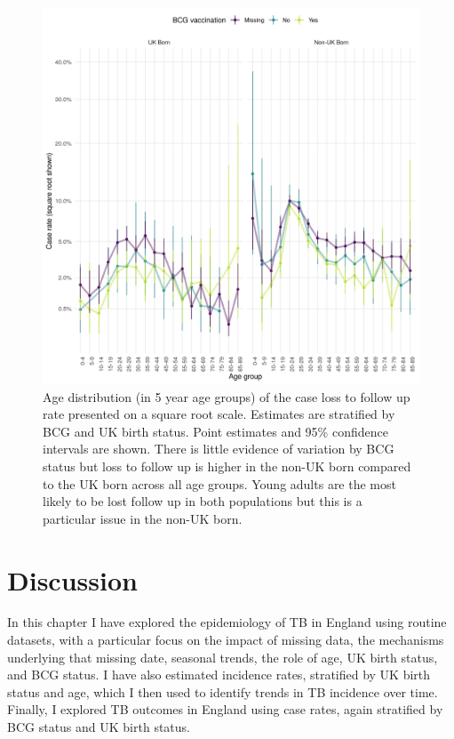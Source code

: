 \documentclass[11pt,twoside]{bristolthesis}
\begin{document}
  \begin{figure}
  
  {\centering \includegraphics[width=0.8\linewidth,]{chapters/tb-epi-england/figures/plot-loss-fol-age-dist} 
  
  }
  
  \caption[Age distribution (in 5 year age groups) of the case loss to follow up rate presented on a square root scale.]{Age distribution (in 5 year age groups) of the case loss to follow up rate presented on a square root scale. Estimates are stratified by BCG and UK birth status. Point estimates and 95\%  confidence intervals are shown. There is little evidence of variation by BCG status but loss to follow up is higher in the non-UK born compared to the UK born across all age groups. Young adults are the most likely to be lost follow up in both populations but this is a particular issue in the non-UK born.}\label{fig:plot-loss-fol-age-dist}
  \end{figure}
  \hypertarget{discussion-1}{%
  \section{Discussion}\label{discussion-1}}
  
  In this chapter I have explored the epidemiology of TB in England using routine datasets, with a particular focus on the impact of missing data, the mechanisms underlying that missing date, seasonal trends, the role of age, UK birth status, and BCG status. I have also estimated incidence rates, stratified by UK birth status and age, which I then used to identify trends in TB incidence over time. Finally, I explored TB outcomes in England using case rates, again stratified by BCG status and UK birth status.
  
\end{document}
